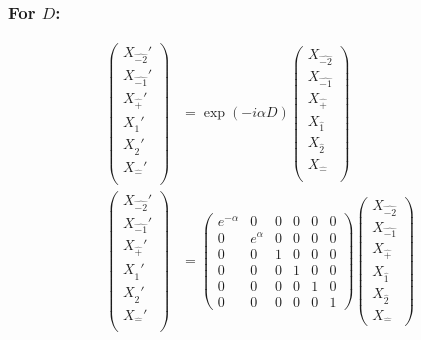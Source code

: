 \documentclass[]{article}
\numberwithin{equation}{section}
\begin{document}
{{\subsubsection{For $D$:}
\begin{align}
\begin{pmatrix}
    {X}_{\hat{-2}}'\\
    {X}_{\hat{-1}}'\\
    {X}_{\hat{+}}'\\
    {X}_{\hat{1}}'\\
    {X}_{\hat{2}}'\\
    {X}_{\hat{-}}'\\
    \end{pmatrix}&= \exp{(-i\alpha D)}\begin{pmatrix}
    {X}_{\hat{-2}}\\
    {X}_{\hat{-1}}\\
    {X}_{\hat{+}}\\
    {X}_{\hat{1}}\\
    {X}_{\hat{2}}\\
    {X}_{\hat{-}}\\
    \end{pmatrix}\\
    \begin{pmatrix}
    {X}_{\hat{-2}}'\\
    {X}_{\hat{-1}}'\\
    {X}_{\hat{+}}'\\
    {X}_{\hat{1}}'\\
    {X}_{\hat{2}}'\\
    {X}_{\hat{-}}'\\
    \end{pmatrix}&= \begin{pmatrix}
        e^{-\alpha}&0&0&0&0&0\\
        0&e^{\alpha}&0&0&0&0\\
        0&0&1&0&0&0\\
        0&0&0&1&0&0\\
        0&0&0&0&1&0\\
        0&0&0&0&0&1
    \end{pmatrix}\begin{pmatrix}
    {X}_{\hat{-2}}\\
    {X}_{\hat{-1}}\\
    {X}_{\hat{+}}\\
    {X}_{\hat{1}}\\
    {X}_{\hat{2}}\\
    {X}_{\hat{-}}
    \end{pmatrix}\\

\end{align}}}
\end{document}
